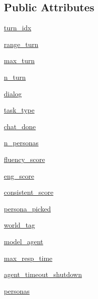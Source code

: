 \subsection*{Public Attributes}
\begin{DoxyCompactItemize}
\item 
\hyperlink{classworlds_1_1PersonaChatEvalWorld_acba8e89cca190d9a53656d10087e818a}{turn\+\_\+idx}
\item 
\hyperlink{classworlds_1_1PersonaChatEvalWorld_a665a0c88898bbe31d1a1a8ba461c9429}{range\+\_\+turn}
\item 
\hyperlink{classworlds_1_1PersonaChatEvalWorld_a2b2a7c4efd28d2fd2efd663bc3fcef1e}{max\+\_\+turn}
\item 
\hyperlink{classworlds_1_1PersonaChatEvalWorld_aaa99f726cdbcdd81a6bcaa0eaebac726}{n\+\_\+turn}
\item 
\hyperlink{classworlds_1_1PersonaChatEvalWorld_a3a839359e827a16d25daf577234cc35b}{dialog}
\item 
\hyperlink{classworlds_1_1PersonaChatEvalWorld_ae6ff8356980eeee972a844a5bdc2b08b}{task\+\_\+type}
\item 
\hyperlink{classworlds_1_1PersonaChatEvalWorld_a3b39b5c509f4ce9d47dab0789ca9abe5}{chat\+\_\+done}
\item 
\hyperlink{classworlds_1_1PersonaChatEvalWorld_a459152c14865510575d033179a785954}{n\+\_\+personas}
\item 
\hyperlink{classworlds_1_1PersonaChatEvalWorld_a898fad169c49e71ae86d33e1f94f78bb}{fluency\+\_\+score}
\item 
\hyperlink{classworlds_1_1PersonaChatEvalWorld_afc7bdee49cb547cae906e7c8ce1e6dba}{eng\+\_\+score}
\item 
\hyperlink{classworlds_1_1PersonaChatEvalWorld_a2826d2e51ec376fb8e1a90810f32f67d}{consistent\+\_\+score}
\item 
\hyperlink{classworlds_1_1PersonaChatEvalWorld_a136ed79f31d4a47bb8ce15f43f6c2564}{persona\+\_\+picked}
\item 
\hyperlink{classworlds_1_1PersonaChatEvalWorld_ae597e51544be2476539c075e6ea0bcad}{world\+\_\+tag}
\item 
\hyperlink{classworlds_1_1PersonaChatEvalWorld_af0520dd6c78c88f79fdd70be7bd7778c}{model\+\_\+agent}
\item 
\hyperlink{classworlds_1_1PersonaChatEvalWorld_a4a9cb91f5422986e69790c7302c952bf}{max\+\_\+resp\+\_\+time}
\item 
\hyperlink{classworlds_1_1PersonaChatEvalWorld_aee0fa9efee57a370499a0691950b548b}{agent\+\_\+timeout\+\_\+shutdown}
\item 
\hyperlink{classworlds_1_1PersonaChatEvalWorld_a4bcc9e1ece3eec3b2fdb39fa3e58be92}{personas}
\end{DoxyCompactItemize}


